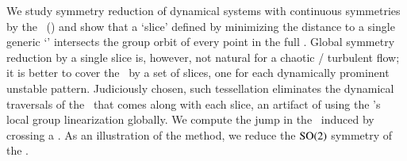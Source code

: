 
We study symmetry reduction of dynamical systems with
continuous symmetries by the \mslices\ (\mframes) and show that a `slice'
defined by minimizing the distance to a single generic `{\template}'
intersects the group orbit of every point in the full {\statesp}. Global
symmetry reduction by a single slice is, however, not natural for a
chaotic / turbulent flow; it is better to cover the \reducedsp\ by a set
of slices, one for each dynamically prominent unstable pattern.
Judiciously chosen, such tessellation eliminates the dynamical traversals
of the \sset\ that comes along with each slice, an artifact of using the
{\template}'s local group linearization globally. We compute the jump in
the \reducedsp\ induced by crossing a \sset. As an illustration of the
method, we reduce the $\textrm{SO}(2)$ symmetry of the \cLe.

%

